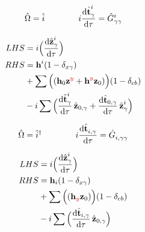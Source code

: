 \documentclass{article}
\newcommand{\bh}{\textbf{h}}
\newcommand{\bt}{\textbf{t}}
\newcommand{\bz}{\textbf{z}}
\newcommand{\up}[1]{\hat{#1}^{\dagger}}
\newcommand{\down}[1]{\hat{#1}}
\begin{document}
\begin{equation}
    \hat{\Omega} = \down{i}
\qquad\qquad
    i\dv{\hat{\bt}^{i}_{\gamma}}{\tau} = \hat{G}^{i}_{\gamma\gamma}
\end{equation}

%
%
%
%
%

\begin{align}\begin{split}
LHS &=
    i\Big(\dv{\hat{\bz}^{i}_{\gamma}}{\tau}\Big)
\\ RHS &=
%
%
\bh^{i}(1-\delta_{x\gamma})\\&+\sum\Big((\bh_0\bz^{\magenta{}\blue{}\red{y}} + \bh^{\blue{}\blue{}\red{y}}\bz_0)\Big)(1-\delta_{cb})\\&-i\sum\Big(\dv{\hat{\bt}^{i}_{\gamma}}{\tau}\,\hat{\bz}_{0, \gamma} + \dv{\hat{\bt}_{0, \gamma}}{\tau}\,\hat{\bz}^{i}_{\gamma}\Big)
\end{split}\end{align}

\vspace{2cm}%
%
%
%
%

\begin{equation}
    \hat{\Omega} = \up{i}
\qquad\qquad
    i\dv{\hat{\bt}^{}_{i,\gamma}}{\tau} = \hat{G}^{}_{i, \gamma\gamma}
\end{equation}

%
%
%
%
%

\begin{align}\begin{split}
LHS &=
    i\Big(\dv{\hat{\bz}^{i}_{\gamma}}{\tau}\Big)
\\ RHS &=
%
%
\bh_{i}(1-\delta_{x\gamma})\\&+\sum\Big((\bh_{\blue{}\blue{}\red{y}}\bz_0)\Big)(1-\delta_{cb})\\&-i\sum\Big(\dv{\hat{\bt}_{i, \gamma}}{\tau}\,\hat{\bz}_{0, \gamma}\Big)
\end{split}\end{align}
\end{document}
